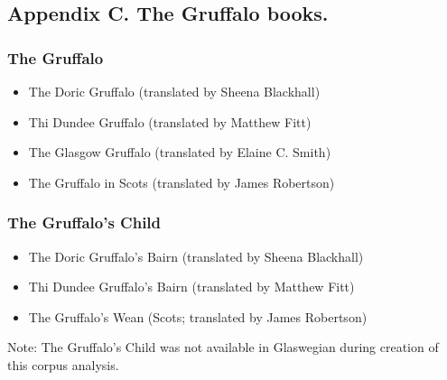 \clearpage



\begin{appendix}
\section{}
\subsection{Appendix C. The Gruffalo books.}\label{appendix-b}

\subsubsection{The Gruffalo}\label{the-gruffalo}

\begin{itemize}
\tightlist
\item
  The Doric Gruffalo (translated by Sheena Blackhall)
\item
  Thi Dundee Gruffalo (translated by Matthew Fitt)
\item
  The Glasgow Gruffalo (translated by Elaine C. Smith)
\item
  The Gruffalo in Scots (translated by James Robertson)
\end{itemize}

\subsubsection{The Gruffalo's Child}\label{the-gruffalos-child}

\begin{itemize}
\tightlist
\item
  The Doric Gruffalo's Bairn (translated by Sheena Blackhall)
\item
  Thi Dundee Gruffalo's Bairn (translated by Matthew Fitt)
\item
  The Gruffalo's Wean (Scots; translated by James Robertson)
\end{itemize}

Note: The Gruffalo's Child was not available in Glaswegian during
creation of this corpus analysis.
\end{appendix}
